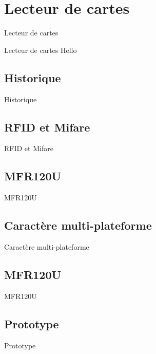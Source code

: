\section{Lecteur de cartes}
\begin{frame}{Lecteur de cartes}
	\begin{block}{Lecteur de cartes}
        Hello
	\end{block}
\end{frame}


\subsection{Historique}
\begin{frame}{Historique}
\end{frame}

\subsection{RFID et Mifare}
\begin{frame}{RFID et Mifare}
\end{frame}

\subsection{MFR120U}
\begin{frame}{MFR120U}
\end{frame}

\subsection{Caractère multi-plateforme}
\begin{frame}{Caractère multi-plateforme}
\end{frame}

\subsection{MFR120U}
\begin{frame}{MFR120U}
\end{frame}

\subsection{Prototype}
\begin{frame}{Prototype}
\end{frame}
